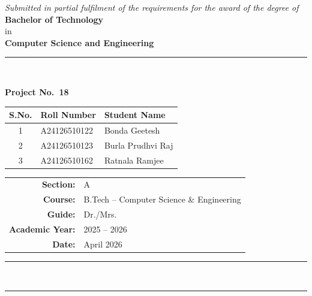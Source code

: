 \documentclass[12pt,a4paper]{report}
\begin{document}
\begin{titlepage}
  \vspace{0.5cm}

  {\large\itshape Submitted in partial fulfilment of the requirements for the award of the degree of}\\[0.3cm]
  {\large\bfseries Bachelor of Technology}\\
  {\large in}\\
  {\large\bfseries Computer Science and Engineering}\\[0.4cm]

  \rule{0.7\linewidth}{0.5pt}\\[0.4cm]

  \begin{tcolorbox}[
      enhanced, colback=blue!3, colframe=anitsblue!70,
      boxrule=0.8pt, arc=3pt, width=0.92\linewidth]
    \centering
    {\normalsize\bfseries\color{anitsblue} Project No.~\textbf{18}}\\[6pt]
    \begin{tabular}{@{} c l l @{}}
      \toprule
      \textbf{S.No.} & \textbf{Roll Number}  & \textbf{Student Name} \\[2pt]
      \midrule
      1 & A24126510122 & Bonda Geetesh \\[4pt]
      2 & A24126510123 & Burla Prudhvi Raj \\[4pt]
      3 & A24126510162 & Ratnala Ramjee \\
      \bottomrule
    \end{tabular}
  \end{tcolorbox}

  \vspace{0.4cm}

  \begin{tabular}{rl}
    \textbf{Section:}       & A \\[4pt]
    \textbf{Course:}        & B.Tech -- Computer Science \& Engineering \\[4pt]
    \textbf{Guide:}         & Dr./Mrs. \underline{\hspace{5cm}} \\[4pt]  %
    \textbf{Academic Year:} & 2025 -- 2026 \\[4pt]
    \textbf{Date:}          & April 2026 \\
  \end{tabular}

  \vfill
  \rule{\linewidth}{0.5pt}\\[0.1cm]
  \rule{\linewidth}{2pt}
\end{titlepage}
\end{document}
